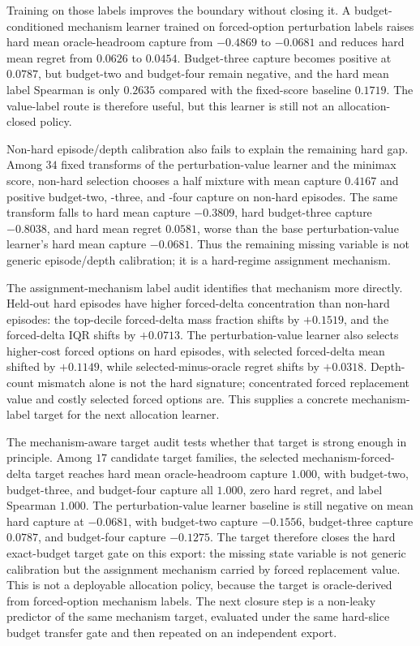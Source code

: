 Training on those labels improves the boundary without closing it.  A
budget-conditioned mechanism learner trained on forced-option perturbation
labels raises hard mean oracle-headroom capture from $-0.4869$ to $-0.0681$ and
reduces hard mean regret from $0.0626$ to $0.0454$.  Budget-three capture
becomes positive at $0.0787$, but budget-two and budget-four remain negative,
and the hard mean label Spearman is only $0.2635$ compared with the fixed-score
baseline $0.1719$.  The value-label route is therefore useful, but this learner
is still not an allocation-closed policy.

Non-hard episode/depth calibration also fails to explain the remaining hard
gap.  Among $34$ fixed transforms of the perturbation-value learner and the
minimax score, non-hard selection chooses a half mixture with mean capture
$0.4167$ and positive budget-two, -three, and -four capture on non-hard
episodes.  The same transform falls to hard mean capture $-0.3809$, hard
budget-three capture $-0.8038$, and hard mean regret $0.0581$, worse than the
base perturbation-value learner's hard mean capture $-0.0681$.  Thus the
remaining missing variable is not generic episode/depth calibration; it is a
hard-regime assignment mechanism.

The assignment-mechanism label audit identifies that mechanism more directly.
Held-out hard episodes have higher forced-delta concentration than non-hard
episodes: the top-decile forced-delta mass fraction shifts by $+0.1519$, and
the forced-delta IQR shifts by $+0.0713$.  The perturbation-value learner also
selects higher-cost forced options on hard episodes, with selected forced-delta
mean shifted by $+0.1149$, while selected-minus-oracle regret shifts by
$+0.0318$.  Depth-count mismatch alone is not the hard signature; concentrated
forced replacement value and costly selected forced options are.  This supplies
a concrete mechanism-label target for the next allocation learner.

The mechanism-aware target audit tests whether that target is strong enough in
principle.  Among $17$ candidate target families, the selected
mechanism-forced-delta target reaches hard mean oracle-headroom capture $1.000$,
with budget-two, budget-three, and budget-four capture all $1.000$, zero hard
regret, and label Spearman $1.000$.  The perturbation-value learner baseline is
still negative on mean hard capture at $-0.0681$, with budget-two capture
$-0.1556$, budget-three capture $0.0787$, and budget-four capture $-0.1275$.
The target therefore closes the hard exact-budget target gate on this export:
the missing state variable is not generic calibration but the assignment
mechanism carried by forced replacement value.  This is not a deployable
allocation policy, because the target is oracle-derived from forced-option
mechanism labels.  The next closure step is a non-leaky predictor of the same
mechanism target, evaluated under the same hard-slice budget transfer gate and
then repeated on an independent export.

